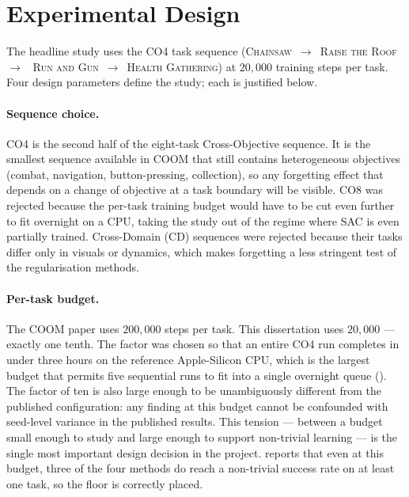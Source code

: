 \section{Experimental Design}
\label{sec:exp_design}

The headline study uses the CO4 task sequence
(\textsc{Chainsaw}~$\rightarrow$~\textsc{Raise the Roof}~$\rightarrow$%
~\textsc{Run and Gun}~$\rightarrow$~\textsc{Health Gathering}) at
$20{,}000$ training steps per task. Four design parameters define
the study; each is justified below.

\paragraph{Sequence choice.}
CO4 is the second half of the eight-task Cross-Objective sequence.
It is the smallest sequence available in COOM that still contains
heterogeneous objectives (combat, navigation, button-pressing,
collection), so any forgetting effect that depends on a change of
objective at a task boundary will be visible. CO8 was rejected
because the per-task training budget would have to be cut even
further to fit overnight on a CPU, taking the study out of the
regime where SAC is even partially trained. Cross-Domain (CD)
sequences were rejected because their tasks differ only in
visuals or dynamics, which makes forgetting a less stringent test of
the regularisation methods.

\paragraph{Per-task budget.}
The COOM paper uses $200{,}000$ steps per task. This dissertation
uses $20{,}000$ --- exactly one tenth. The factor was chosen so
that an entire CO4 run completes in under three hours on the
reference Apple-Silicon CPU, which is the largest budget that
permits five sequential runs to fit into a single overnight queue
(). The factor of ten is also large enough to be
unambiguously different from the published configuration: any
finding at this budget cannot be confounded with seed-level
variance in the published results. This tension --- between a
budget small enough to study and large enough to support
non-trivial learning --- is the single most important design
decision in the project.  reports that even at this
budget, three of the four methods do reach a non-trivial success
rate on at least one task, so the floor is correctly placed.

